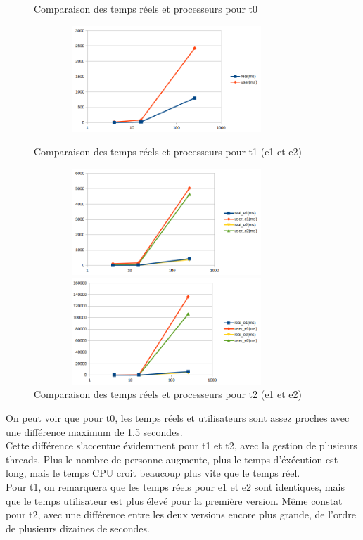 \documentclass[11pt]{article} %
\begin{document}
\begin{figure}[!h]
  \centering
\caption{Comparaison des temps réels et processeurs pour t0}

\includegraphics[width=10cm, height=4cm]{t0}

 \caption{Comparaison des temps réels et processeurs pour t1 (e1 et e2)}

\includegraphics[width=10cm,height=4cm]{t1}

 \caption{Comparaison des temps réels et processeurs pour t2 (e1 et e2)}

\includegraphics[width=10cm,height=4cm]{t2}
\end{figure}


\newpage

On peut voir que pour t0, les temps réels et utilisateurs sont assez proches avec une différence maximum de 1.5 secondes. \\
Cette différence s'accentue évidemment pour t1 et t2, avec la gestion de plusieurs threads. Plus le nombre de personne augmente, plus le temps d'éxécution est long, mais le temps CPU croit beaucoup plus vite que le temps réel. \\
Pour t1, on remarquera que les temps réels pour e1 et e2 sont identiques, mais que le temps utilisateur est plus élevé pour la première version. Même constat pour t2, avec une différence entre les deux versions encore plus grande, de l'ordre de plusieurs dizaines de secondes.
\end{document}
